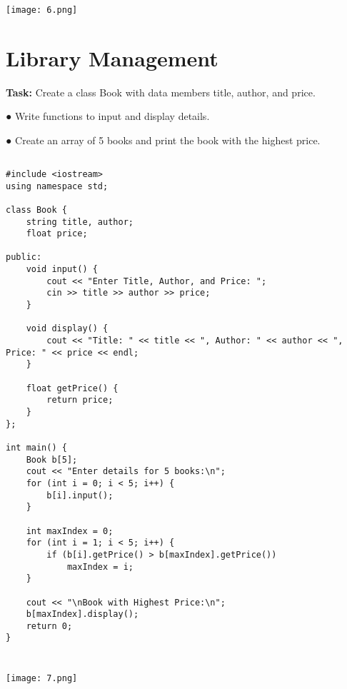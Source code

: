 \documentclass[12pt,a4paper]{article}
\begin{document}
\subsubsection{}
\begin{center}
    \texttt{[image: 6.png]}
\end{center}


\section{Library Management}
\textbf{Task:} 
Create a class Book with data members title, author, and price.
    \item ● Write functions to input and display details.
    \item ● Create an array of 5 books and print the book with the highest price.

\subsection{}
\begin{lstlisting}
#include <iostream>
using namespace std;

class Book {
    string title, author;
    float price;

public:
    void input() {
        cout << "Enter Title, Author, and Price: ";
        cin >> title >> author >> price;
    }

    void display() {
        cout << "Title: " << title << ", Author: " << author << ", Price: " << price << endl;
    }

    float getPrice() {
        return price;
    }
};

int main() {
    Book b[5];
    cout << "Enter details for 5 books:\n";
    for (int i = 0; i < 5; i++) {
        b[i].input();
    }

    int maxIndex = 0;
    for (int i = 1; i < 5; i++) {
        if (b[i].getPrice() > b[maxIndex].getPrice())
            maxIndex = i;
    }

    cout << "\nBook with Highest Price:\n";
    b[maxIndex].display();
    return 0;
}


\end{lstlisting}

\subsubsection{}
\begin{center}
    \texttt{[image: 7.png]}
\end{center}
\end{document}
